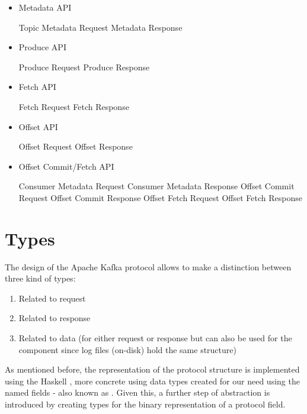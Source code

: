 \begin{itemize}
    \item Metadata API
    \begin{itemize}
        \tick Topic Metadata Request
        \tick Metadata Response
    \end{itemize}
    \item Produce API
    \begin{itemize}
        \tick Produce Request
        \tick Produce Response
    \end{itemize}
    \item Fetch API
    \begin{itemize}
        \tick Fetch Request
        \tick Fetch Response
    \end{itemize}
    \item Offset API
    \begin{itemize}
        \fail Offset Request
        \fail Offset Response
    \end{itemize}

    \item Offset Commit/Fetch API
    \begin{itemize}
        \fail Consumer Metadata Request
        \fail Consumer Metadata Response
        \fail Offset Commit Request
        \fail Offset Commit Response
        \fail Offset Fetch Request
        \fail Offset Fetch Response
    \end{itemize}
\end{itemize}

\section{Types}
The design of the Apache Kafka protocol allows to make a distinction between three kind of types:
\begin{enumerate}
  \item Related to request
  \item Related to response
  \item Related to data (for either request or response but can also be used for the  component since log files (on-disk) hold the same structure)
\end{enumerate}

As mentioned before, the representation of the protocol structure is implemented using the Haskell , more concrete using data types created
for our need using the named fields - also known as . Given this, a
further step of abstraction is introduced by creating types for the binary
representation of a protocol field. 

